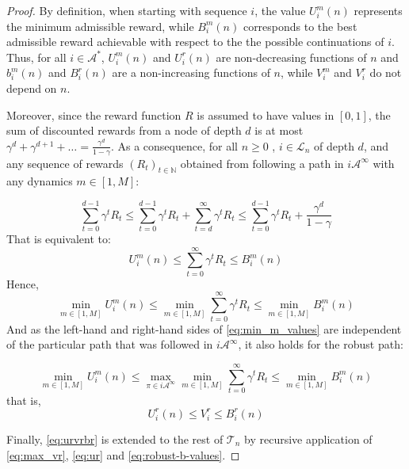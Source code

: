 \documentclass{article}
\begin{document}
\begin{proof}
	By definition, when starting with sequence $i$, the value $U_i^m(n)$ represents the minimum admissible reward, while $B_i^m(n)$ corresponds to the best admissible reward achievable with respect to the the possible continuations of $i$. Thus, for all $i\in\mathcal{A}^*$, $U_i^m(n)$ and $U_i^r(n)$ are non-decreasing functions of $n$ and $b_i^m(n)$ and $B_i^r(n)$ are a non-increasing functions of $n$, while $V_i^m$ and $V_i^r$ do not depend on $n$.
	
	Moreover, since the reward function $R$ is assumed to have values in $[0, 1]$, the sum of discounted rewards from a node of depth $d$ is at most $\gamma^d + \gamma^{d+1}+\dots = \frac{\gamma^d}{1-\gamma}$. As a consequence, for all $n \geq 0$ , $i\in\mathcal{L}_n$ of depth $d$, and any sequence of rewards $(R_t)_{t\in\mathbb{N}}$ obtained from following a path in $i\mathcal{A}^\infty$ with any dynamics $m \in [1, M]$:
	
	\begin{equation*}
	\sum_{t=0}^{d-1} \gamma^t R_t \leq \sum_{t=0}^{d-1} \gamma^t R_t + \sum_{t=d}^\infty \gamma^t R_t \leq \sum_{t=0}^{d-1} \gamma^t R_t + \frac{\gamma^d}{1-\gamma}
	\end{equation*}
	That is equivalent to:
	\begin{equation*}
	U^m_i(n) \leq \sum_{t=0}^\infty \gamma^t R_t \leq B^m_i(n) 
	\end{equation*}
	Hence,
	\begin{equation}
	\label{eq:min_m_values}
	\min_{m \in [1, M]} U^m_i(n) \leq \min_{m \in [1, M]} \sum_{t=0}^\infty \gamma^t R_t \leq \min_{m \in [1, M]} B^m_i(n)
	\end{equation}
	And as the left-hand and right-hand sides of \eqref{eq:min_m_values} are independent of the particular path that was followed in $i\mathcal{A}^\infty$, it also holds for the robust path:
	
	\begin{equation*}
	\min_{m \in [1, M]} U^m_i(n) \leq \max_{\pi\in i\mathcal{A}^\infty} \min_{m \in [1, M]} \sum_{t=0}^\infty \gamma^t R_t \leq \min_{m \in [1, M]} B^m_i(n)
	\end{equation*}
	that is,
	\begin{equation}
	\label{eq:urvrbr}
	U^r_i(n) \leq V^r_i  \leq B^r_i(n)
	\end{equation}
	
	Finally, \eqref{eq:urvrbr} is extended to the rest of $\mathcal{T}_n$ by recursive application of \eqref{eq:max_vr}, \eqref{eq:ur} and \eqref{eq:robust-b-values}.
\end{proof}
\end{document}
